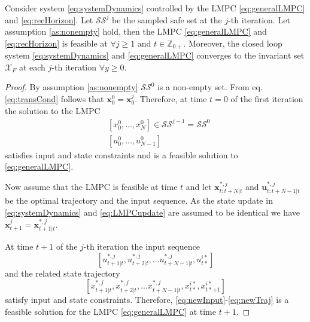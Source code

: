 \begin{theorem}
Consider system \eqref{eq:systemDynamics} controlled by the LMPC \eqref{eq:generalLMPC} and \eqref{eq:recHorizon}. Let $\mathcal{SS}^j$ be the sampled safe set at the $j$-th iteration. Let assumption \ref{as:nonempty} hold, then the LMPC \eqref{eq:generalLMPC} and \eqref{eq:recHorizon} is feasible at $\forall j\geq 1$ and $t\in \mathbb{Z}_{0+}$. Moreover, the closed loop system \eqref{eq:systemDynamics} and \eqref{eq:generalLMPC} converges to the invariant set $\mathcal{X}_F$ at each $j$-th iteration $\forall y\geq 0$.
\end{theorem}
\begin{proof}
By assumption \ref{as:nonempty} $\mathcal{SS}^0$ is a non-empty set. From eq. \eqref{eq:transCond} follows that $\bm{x}_0^0=\bm{x}_0^j$. Therefore, at time $t=0$ of the first iteration the solution to the LMPC
\begin{align}
&[x_0^0,...,x_N^0]\in\mathcal{SS}^{j-1}=\mathcal{SS}^0\\
&[u_0^0,...,u_{N-1}^0]
\end{align}
satisfies input and state constraints and is a feasible solution to \eqref{eq:generalLMPC}.

Now assume that the LMPC is feasible at time $t$ and let $\bm{x}_{t:t+N|t}^{*,j}$ and $\bm{u}_{t:t+N-1|t}^{*,j}$ be the optimal trajectory and the input sequence. As the state update in \eqref{eq:systemDynamics} and \eqref{eq:LMPCupdate} are assumed to be identical we have $\bm{x}_{t+1}^j=\bm{x}_{t+1|t}^{*,j}$.

At time $t+1$ of the $j$-th iteration the input sequence
\begin{equation}\label{eq:newInput}
[u_{t+1|t}^{*,j},u_{t+2|t}^{*,j},...u_{t+N-1|t}^{*,j},u_{t*}^{i*}]
\end{equation}
and the related state trajectory
\begin{equation}\label{eq:newTraj}
[x_{t+1|t}^{*,j},x_{t+2|t}^{*,j},...x_{t+N-1|t}^{*,j},x_{t*}^{i*},x_{t*+1}^{i*}]
\end{equation}
satisfy input and state constraints. Therefore, \eqref{eq:newInput}-\eqref{eq:newTraj} is a feasible solution for the LMPC \eqref{eq:generalLMPC} at time $t+1$.


\end{proof}

